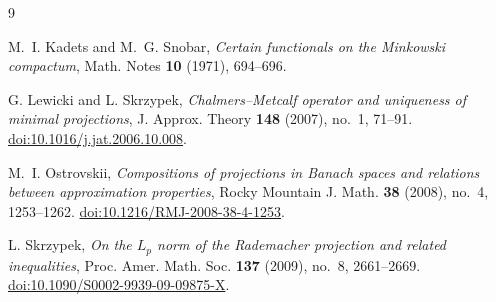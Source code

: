 \documentclass[11pt]{article}
\theoremstyle{remark}
\begin{document}
\begin{thebibliography}{9}

M.~I. Kadets and M.~G. Snobar,
\emph{Certain functionals on the Minkowski compactum},
Math. Notes \textbf{10} (1971), 694--696.

G. Lewicki and L. Skrzypek,
\emph{Chalmers--Metcalf operator and uniqueness of minimal projections},
J. Approx. Theory \textbf{148} (2007), no.~1, 71--91.
\href{https://doi.org/10.1016/j.jat.2006.10.008}{doi:10.1016/j.jat.2006.10.008}.

M.~I. Ostrovskii,
\emph{Compositions of projections in Banach spaces and relations between
approximation properties},
Rocky Mountain J. Math. \textbf{38} (2008), no.~4, 1253--1262.
\href{https://doi.org/10.1216/RMJ-2008-38-4-1253}{doi:10.1216/RMJ-2008-38-4-1253}.

L. Skrzypek,
\emph{On the $L_p$ norm of the Rademacher projection and related inequalities},
Proc. Amer. Math. Soc. \textbf{137} (2009), no.~8, 2661--2669.
\href{https://doi.org/10.1090/S0002-9939-09-09875-X}{doi:10.1090/S0002-9939-09-09875-X}.

\end{thebibliography}
\end{document}
